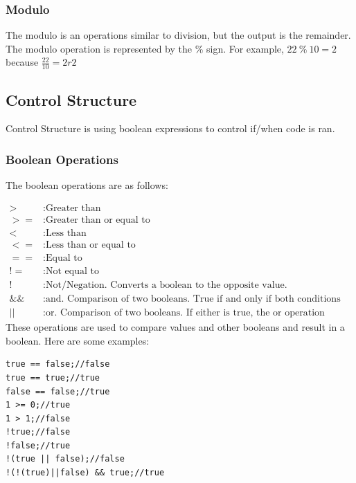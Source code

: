 \documentclass{article}
\begin{document}
\subsubsection{Modulo}
The modulo is an operations similar to division, but the output is the remainder. The modulo operation is represented by the \% sign. For example, $22~\%~10 = 2$ because $ \frac{22}{10} = 2r2$

\subsection{Control Structure}
Control Structure is using boolean expressions to control if/when code is ran. 
\subsubsection{Boolean Operations}
The boolean operations are as follows:

\begin{align*}
	 >  &: \text{Greater than}\\
	 >= &: \text{Greater than or equal to} \\
	 <  &: \text{Less than}\\
	 <= &: \text{Less than or equal to}\\
	 == &: \text{Equal to} \\
	 != &: \text{Not equal to} \\
	 !  &: \text{Not/Negation. Converts a boolean to the opposite value.}\\
	 \&\& &: \text{and. Comparison of two booleans. True if and only if both conditions are true.}\\
	 || &: \text{or. Comparison of two booleans. If either is true, the or operation results in true}
\end{align*}
These operations are used to compare values and other booleans and result in a boolean. Here are some examples:
\begin{lstlisting}
true == false;//false
true == true;//true
false == false;//true
1 >= 0;//true
1 > 1;//false
!true;//false
!false;//true
!(true || false);//false
!(!(true)||false) && true;//true
\end{lstlisting}
\end{document}
